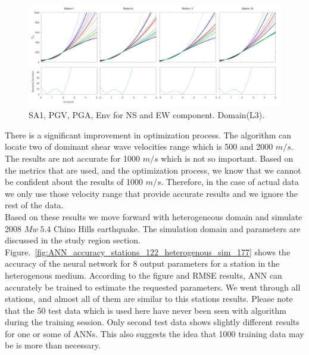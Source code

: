   \begin{figure}[ht]
    \centering
    \includegraphics[width=\textwidth]{figures/pdf/station_8_param_2000_1000_500.pdf}
    \caption{SA1, PGV, PGA, Env for NS and EW component. Domain(L3).  }
    \label{fig:station_8_param_2000_1000_500}
\end{figure}

There is a significant improvement in optimization process. The algorithm can locate two of dominant shear wave velocities range which is 500 and 2000 $m/s$. The results are not accurate for 1000 $m/s$ which is not so important. Based on the metrics that are used, and the optimization process, we know that we cannot be confident about the results of 1000 $m/s$. Therefore, in the case of actual data we only use those velocity range that provide accurate results and we ignore the rest of the data.\\
Based on these results we move forward with heterogeneous domain and simulate 2008  $Mw~5.4$ Chino Hills earthquake. The simulation domain and parameters are discussed in the study region section. Figure.~\ref{fig:ANN_accuracy_stations_122_heterogenous_sim_177} shows the accuracy of the neural network for 8 output parameters for a station in the heterogenous medium. According to the figure and RMSE results, ANN can accurately be trained to estimate the requested parameters. We went through all stations, and almost all of them are similar to this stations results. Please note that the 50 test data which is used here have never been seen with algorithm during the training session. Only second test data shows slightly different results for one or some of ANNs. This also suggests the idea that 1000 training data may be is more than necessary. 

